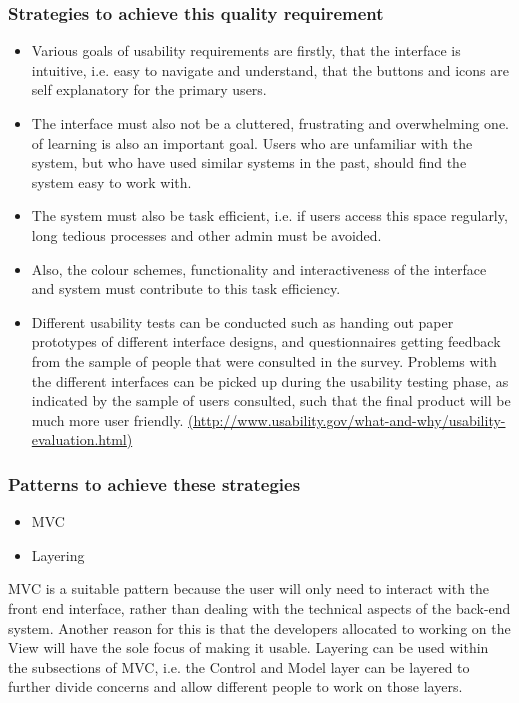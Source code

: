 \documentclass[a4paper,12pt]{article}
\begin{document}
 \subsubsection{Strategies to achieve this quality requirement}
 \begin{itemize}
 \item Various goals of usability requirements are firstly, that the interface is intuitive, i.e. easy to navigate and understand, that the buttons and icons are self explanatory for the primary users.
 \item The interface must also not be a cluttered, frustrating and overwhelming one. 
 \itemEase of learning is also an important goal. Users who are unfamiliar with the system, but who have used similar systems in the past, should find the system easy to work with.
 \item The system must also be task efficient, i.e. if users access this space regularly, long tedious processes and other admin must be avoided.
\item Also, the colour schemes, functionality and interactiveness of the interface and system must contribute to this task efficiency. 
\item Different usability tests can be conducted such as handing out paper prototypes of different interface designs, and questionnaires getting feedback from the sample of people that were consulted in the survey. Problems with the different interfaces can be picked up during the usability testing phase, as indicated by the sample of users consulted, such that the final product will be much more user friendly. \url{(http://www.usability.gov/what-and-why/usability-evaluation.html)}

 \end{itemize}
 \subsubsection{Patterns to achieve these strategies}
 \begin{itemize}
 \item MVC
 \item Layering
\end{itemize}
MVC is a suitable pattern because the user will only need to interact with the front end interface, rather than dealing with the technical aspects of the back-end system. Another reason for this is that the developers allocated to working on the View will have the sole focus of making it usable.
Layering can be used within the subsections of MVC, i.e. the Control and Model layer can be layered to further divide concerns and allow different people to work on those layers.
\end{document}
